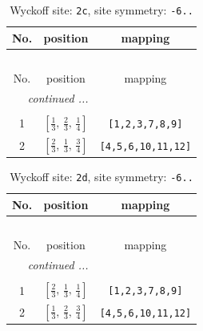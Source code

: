 \documentclass[fleqn,8pt]{jsarticle}
\begin{document}
\begin{longtable}{ccc}
\caption{Wyckoff site: {\tt 2c}, site symmetry: {\tt -6..}}
 \\
 \hline \hline
No. & position & mapping \\ \hline \endfirsthead

\multicolumn{2}{l}{\tablename\ \thetable{}} \\
 \hline \hline
No. & position & mapping \\ \hline \endhead

 \hline \hline
\multicolumn{2}{r}{\footnotesize\it continued ...} \\ \endfoot

 \hline \hline
\multicolumn{2}{r}{} \\ \endlastfoot

1 & $\left[ \frac{1}{3},\, \frac{2}{3},\, \frac{1}{4} \right]$ & {\tt [1,2,3,7,8,9]} \\ \hline
2 & $\left[ \frac{2}{3},\, \frac{1}{3},\, \frac{3}{4} \right]$ & {\tt [4,5,6,10,11,12]} \\
\end{longtable}
\renewcommand{\arraystretch}{1.2}
\begin{longtable}{ccc}
\caption{Wyckoff site: {\tt 2d}, site symmetry: {\tt -6..}}
 \\
 \hline \hline
No. & position & mapping \\ \hline \endfirsthead

\multicolumn{2}{l}{\tablename\ \thetable{}} \\
 \hline \hline
No. & position & mapping \\ \hline \endhead

 \hline \hline
\multicolumn{2}{r}{\footnotesize\it continued ...} \\ \endfoot

 \hline \hline
\multicolumn{2}{r}{} \\ \endlastfoot

1 & $\left[ \frac{2}{3},\, \frac{1}{3},\, \frac{1}{4} \right]$ & {\tt [1,2,3,7,8,9]} \\ \hline
2 & $\left[ \frac{1}{3},\, \frac{2}{3},\, \frac{3}{4} \right]$ & {\tt [4,5,6,10,11,12]} \\
\end{longtable}
\renewcommand{\arraystretch}{1.2}
\end{document}
